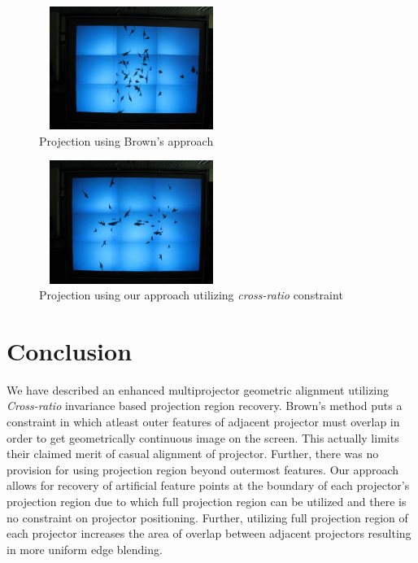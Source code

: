 \documentclass[letterpaper,10pt,conference]{/home/pranav/Desktop/Publication_work/latex_class_files/IEEEtran}
\begin{document}
\begin{figure}
\centering
\includegraphics[width=6cm,height=4cm]{figures/without_cross_rat1.jpg}
\caption{Projection using Brown's\cite{brown} approach}
\label{without_crossrat}
\end{figure}


\begin{figure}
\centering
\includegraphics[width=6cm,height=4cm]{figures/with_cross_rat1.jpg}
\caption{Projection using our approach utilizing \textit{cross-ratio} constraint}
\label{with_crossrat}
\end{figure}

\section{Conclusion}
We have described an enhanced multiprojector geometric alignment utilizing \textit{Cross-ratio} invariance based projection region recovery. Brown's method puts a constraint in which atleast outer features of adjacent projector must overlap in order to get geometrically continuous image on the screen. This actually limits their claimed merit of casual alignment of projector. Further, there was no provision for using projection region beyond outermost features. Our approach allows for recovery of artificial feature points at the boundary of each projector's projection region due to which full projection region can be utilized and there is no constraint on projector positioning. Further, utilizing full projection region of each projector increases the area of overlap between adjacent projectors resulting in more uniform edge blending.
\end{document}

